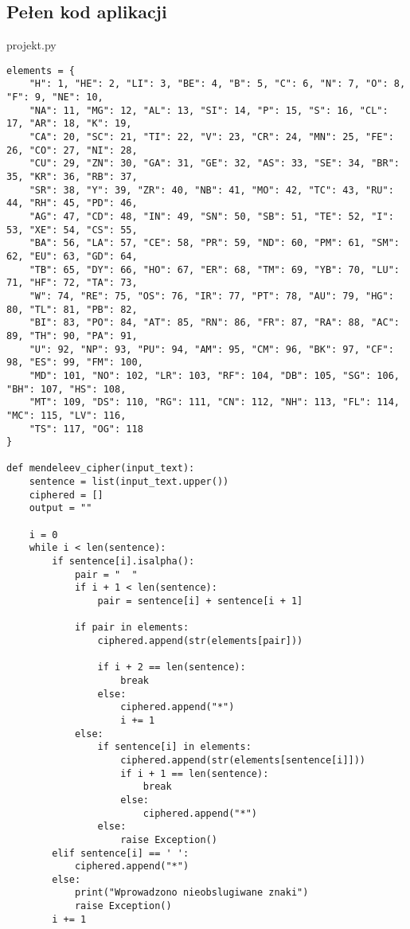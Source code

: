 \documentclass[12pt,a4paper]{article}
\begin{document}
	\subsection*{Pełen kod aplikacji}
        \centering projekt.py
\begin{lstlisting}
elements = {
    "H": 1, "HE": 2, "LI": 3, "BE": 4, "B": 5, "C": 6, "N": 7, "O": 8, "F": 9, "NE": 10,
    "NA": 11, "MG": 12, "AL": 13, "SI": 14, "P": 15, "S": 16, "CL": 17, "AR": 18, "K": 19,
    "CA": 20, "SC": 21, "TI": 22, "V": 23, "CR": 24, "MN": 25, "FE": 26, "CO": 27, "NI": 28,
    "CU": 29, "ZN": 30, "GA": 31, "GE": 32, "AS": 33, "SE": 34, "BR": 35, "KR": 36, "RB": 37,
    "SR": 38, "Y": 39, "ZR": 40, "NB": 41, "MO": 42, "TC": 43, "RU": 44, "RH": 45, "PD": 46,
    "AG": 47, "CD": 48, "IN": 49, "SN": 50, "SB": 51, "TE": 52, "I": 53, "XE": 54, "CS": 55,
    "BA": 56, "LA": 57, "CE": 58, "PR": 59, "ND": 60, "PM": 61, "SM": 62, "EU": 63, "GD": 64,
    "TB": 65, "DY": 66, "HO": 67, "ER": 68, "TM": 69, "YB": 70, "LU": 71, "HF": 72, "TA": 73,
    "W": 74, "RE": 75, "OS": 76, "IR": 77, "PT": 78, "AU": 79, "HG": 80, "TL": 81, "PB": 82,
    "BI": 83, "PO": 84, "AT": 85, "RN": 86, "FR": 87, "RA": 88, "AC": 89, "TH": 90, "PA": 91,
    "U": 92, "NP": 93, "PU": 94, "AM": 95, "CM": 96, "BK": 97, "CF": 98, "ES": 99, "FM": 100,
    "MD": 101, "NO": 102, "LR": 103, "RF": 104, "DB": 105, "SG": 106, "BH": 107, "HS": 108,
    "MT": 109, "DS": 110, "RG": 111, "CN": 112, "NH": 113, "FL": 114, "MC": 115, "LV": 116,
    "TS": 117, "OG": 118
}

def mendeleev_cipher(input_text):
    sentence = list(input_text.upper())
    ciphered = []
    output = ""
    
    i = 0
    while i < len(sentence):
        if sentence[i].isalpha():
            pair = "  "
            if i + 1 < len(sentence):
                pair = sentence[i] + sentence[i + 1]

            if pair in elements:
                ciphered.append(str(elements[pair]))

                if i + 2 == len(sentence):
                    break
                else:
                    ciphered.append("*")
                    i += 1
            else:
                if sentence[i] in elements:
                    ciphered.append(str(elements[sentence[i]]))
                    if i + 1 == len(sentence):
                        break
                    else:
                        ciphered.append("*")
                else:
                    raise Exception()
        elif sentence[i] == ' ':
            ciphered.append("*")
        else:
            print("Wprowadzono nieobslugiwane znaki")
            raise Exception()
        i += 1


\end{lstlisting}
\end{document}
